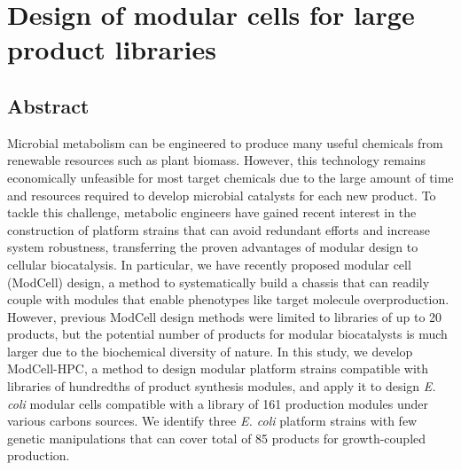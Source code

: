 \chapter{Design of modular cells for large product libraries}
\label{ch:hpc}


\section*{Abstract}
    Microbial metabolism can be engineered to produce many useful chemicals from renewable resources such as plant biomass.
    However, this technology remains economically unfeasible for most target chemicals due to the large amount of time and resources required to develop microbial catalysts for each new product.
    To tackle this challenge, metabolic engineers have gained recent interest in the construction of platform strains that can avoid redundant efforts and increase system robustness, transferring the proven advantages of modular design to cellular biocatalysis.
    In particular, we have recently proposed modular cell (ModCell) design, a method to systematically build a chassis that can readily couple with modules that enable phenotypes like target molecule overproduction.
    However, previous ModCell design methods were limited to libraries of up to 20 products, but the potential number of products for modular biocatalysts is much larger due to the biochemical diversity of nature.
    In this study, we develop ModCell-HPC, a method to design modular platform strains compatible with libraries of hundredths of product synthesis modules, and apply it to design \textit{E. coli} modular cells compatible with a library of 161 production modules under various carbons sources.
    We identify three \textit{E. coli} platform strains with few genetic manipulations that can cover total of 85 products for growth-coupled production.
